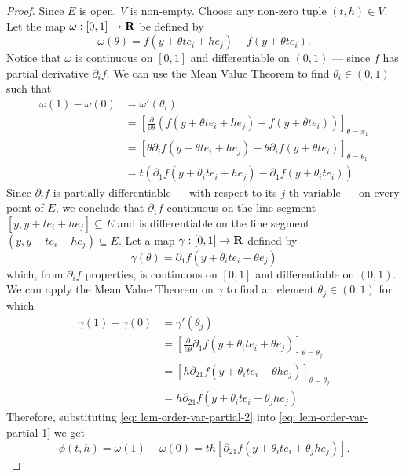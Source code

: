 \begin{proof}
    Since \(E\) is open, \(V\) is non-empty. Choose any non-zero tuple \((t, h)
    \in V\). Let the map \(\omega: [0, 1] \to \mathbf{R}\) be defined by
    \[
        \omega(\theta) = f(y + \theta t e_i + h e_j) - f(y + \theta t e_i).
    \]
    Notice that \(\omega\) is continuous on \([0, 1]\) and differentiable on \((0,
    1)\) --- since \(f\) has partial derivative \(\partial_i f\). We can use the
    Mean Value Theorem to find \(\theta_i \in (0, 1)\) such that
    \begin{align}\label{eq: lem-order-var-partial-1}
        \nonumber
        \omega(1) - \omega(0)
         & = \omega'(\theta_i)
        \\
        \nonumber
         & = \left[ \frac{\partial}{\partial \theta} \left(
            f(y + \theta t e_i + h e_j) - f(y + \theta t e_i)
            \right) \right]_{\theta = x_1}
        \\
         & = \left[
            \theta \partial_i f(y + \theta t e_i + h e_j)
            - \theta \partial_i f(y + \theta t e_i)
            \right]_{\theta = \theta_1}
        \\
         & = t (\partial_1 f(y + \theta_i t e_i + h e_j)
        - \partial_1 f(y + \theta_i t e_i))
    \end{align}
    Since \(\partial_i f\) is partially differentiable --- with respect to its
    \(j\)-th variable --- on every point of \(E\), we conclude that \(\partial_1
    f\) continuous on the line segment \([y, y + t e_i + h e_j] \subseteq E\) and
    is differentiable on the line segment \((y, y + t e_i + h e_j) \subseteq E\).
    Let a map \(\gamma: [0, 1] \to \mathbf{R}\) defined by
    \[
        \gamma(\theta) = \partial_1 f(y + \theta_i t e_i + \theta e_j)
    \]
    which, from \(\partial_i f\) properties, is continuous on \([0, 1]\) and
    differentiable on \((0, 1)\). We can apply the Mean Value Theorem on
    \(\gamma\) to find an element \(\theta_j \in (0, 1)\) for which
    \begin{align}\label{eq: lem-order-var-partial-2}
        \nonumber
        \gamma(1) - \gamma(0)
         & = \gamma'(\theta_j)
        \\ \nonumber
         & = \left[
            \frac{\partial}{\partial \theta}
            \partial_1 f(y + \theta_i t e_i + \theta e_j)
            \right]_{\theta = \theta_j}
        \\ \nonumber
         & = \left[
            h \partial_{21} f(y + \theta_i t e_i + \theta h e_j)
            \right]_{\theta = \theta_j}
        \\
         & = h \partial_{2 1} f(y + \theta_i t e_i + \theta_j h e_j)
    \end{align}
    Therefore, substituting \cref{eq: lem-order-var-partial-2} into \cref{eq:
        lem-order-var-partial-1} we get
    \[
        \phi(t, h) = \omega(1) - \omega(0)
        = t h [\partial_{2 1} f(y + \theta_i t e_i + \theta_j h e_j)].
    \]
\end{proof}

